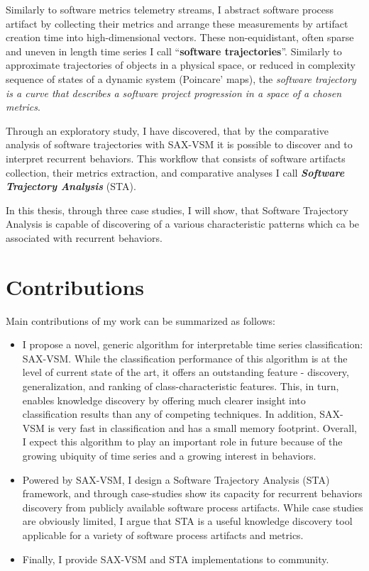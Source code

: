 Similarly to software metrics telemetry streams, I abstract software process artifact by collecting their 
metrics and arrange these measurements by artifact creation time into high-dimensional vectors. 
These non-equidistant, often sparse and uneven in length time series 
I call ``\textbf{software trajectories}''. Similarly to approximate trajectories of objects in 
a physical space, or reduced in complexity sequence of states of a dynamic system (Poincare' maps), 
the \textit{software trajectory is a curve that describes a software project progression in a space 
of a chosen metrics}.

Through an exploratory study, I have discovered, that by the comparative analysis of software trajectories 
with SAX-VSM it is possible to discover and to interpret recurrent behaviors. This workflow that 
consists of software artifacts collection, their metrics extraction, and comparative analyses I call 
\textit{\textbf{Software Trajectory Analysis}} (STA). 

In this thesis, through three case studies, I will show, that Software Trajectory Analysis is capable 
of discovering of a various characteristic patterns which ca be associated with recurrent behaviors.

\section{Contributions}\label{section_contributions}
Main contributions of my work can be summarized as follows: 
\begin{itemize}
\item I propose a novel, generic algorithm for interpretable time series classification: SAX-VSM. 
While the classification performance of this algorithm is at the level of current state of the art, 
it offers an outstanding feature - discovery, generalization, and ranking of class-characteristic features. 
This, in turn, enables knowledge discovery by offering much clearer insight into classification results than any of 
competing techniques.
In addition, SAX-VSM is very fast in classification and has a small memory footprint. 
Overall, I expect this algorithm to play an important role in future because of the growing ubiquity of time series and 
a growing interest in behaviors.
\item Powered by SAX-VSM, I design a Software Trajectory Analysis (STA) framework, and through case-studies 
show its capacity for recurrent behaviors discovery from publicly available software process
artifacts. While case studies are obviously limited, I argue that STA is a useful knowledge discovery tool applicable for a 
variety of software process artifacts and metrics. 
\item Finally, I provide SAX-VSM and STA implementations to community.
\end{itemize}


